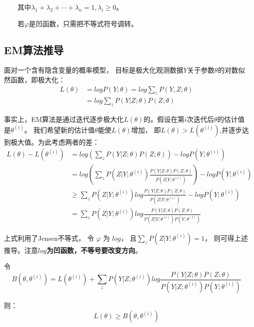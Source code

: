 \documentclass[a4paper,12pt]{book}
\begin{document}
　　其中$\lambda_1 + \lambda_2 + \cdots + \lambda_n = 1, \lambda_i \ge 0$。

　　若$\varphi$是凹函数，只需把不等式符号调转。
　　
    \subsection{EM算法推导}
    面对一个含有隐含变量的概率模型，
    目标是极大化观测数据$Y$关于参数$\theta$的对数似然函数，即极大化：
    \begin{equation}
        \begin{split}
            L(\theta) &= log P(Y;\theta) = log \sum_{z} P(Y,Z; \theta)\\
            &= log \sum_{z} P(Y|Z; \theta) P(Z; \theta)
        \end{split}
    \end{equation}


    事实上，EM算法是通过迭代逐步极大化$L(\theta)$的。假设在第$i
    $次迭代后$\theta$的估计值是$\theta^{(i)}$。
    我们希望新的估计值$\theta$能使$L(\theta)$增加，
    即$L(\theta) > L(\theta^{(i)})$,并逐步达到极大值。为此考虑两者的差：
    \begin{equation}
        \begin{split}
            L(\theta) - L(\theta^{(i)}) &=log (\sum_{z} P(Y|Z; \theta) P(Z; \theta)) - log P(Y;\theta^{(i)}) \\
            &= log (\sum_{z} P(Z|Y;\theta^{(i)}) \frac{P(Y|Z; \theta) P(Z; \theta)}{P(Z|Y; \theta^{(i)})}) - log P(Y;\theta^{(i)}) \\
            &\ge \sum_{z} P(Z|Y;\theta^{(i)}) log \frac{P(Y|Z; \theta) P(Z; \theta)}{P(Z|Y; \theta^{(i)})} -log P(Y;\theta^{(i)}) \\
            &= \sum_{z} P(Z|Y;\theta^{(i)}) log \frac{P(Y|Z; \theta) P(Z; \theta)}{P(Z|Y; \theta^{(i)})P(Y;\theta^{(i)})}
        \end{split}
    \end{equation}

    上式利用了Jensen不等式， 
    令 $\varphi$ 为 $log$， 且$\sum_{z} P(Z|Y;\theta^{(i)}) =1$，
    则可得上述推导。注意\textbf{$log$为凹函数，不等号要改变方向}。

    令
    \begin{equation}
        B(\theta,\theta^{(i)}) = L(\theta^{(i)}) + \sum_{z} P(Y|Z;\theta^{(i)}) log \frac{P(Y|Z; \theta) P(Z; \theta)}{P(Y|Z; \theta^{(i)})P(Y;\theta^{(i)})}
    \end{equation}

    则：
    \begin{equation}
        L(\theta) \ge B(\theta,\theta^{(i)})
    \end{equation}
\end{document}
